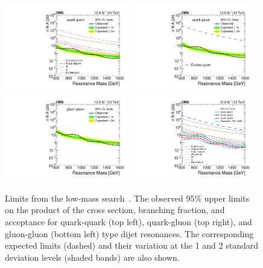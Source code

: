 \begin{figure}[hbtp]
  \centering
    \includegraphics[width=0.48\textwidth]{figs/dijet/limits_freq_qq_calodijet2016.pdf}
    \includegraphics[width=0.48\textwidth]{figs/dijet/limits_freq_qg_calodijet2016.pdf}
    \includegraphics[width=0.48\textwidth]{figs/dijet/limits_freq_gg_calodijet2016.pdf}
    \includegraphics[width=0.48\textwidth]{figs/dijet/limits_freq_gg_qg_qq_gaus10_calodijet2016.pdf}
    \caption{Limits from the low-mass search~\cite{CMS-PAS-EXO-16-032,jmgd}. The observed 95\% \CL upper limits on the product of the cross section, branching fraction, and acceptance for
    quark-quark (top left), quark-gluon (top right), and gluon-gluon (bottom left) type dijet resonances.
    The corresponding expected limits (dashed) and their variation at the 1 and 2 standard deviation levels (shaded bands) are also shown.   
}
\end{figure}
